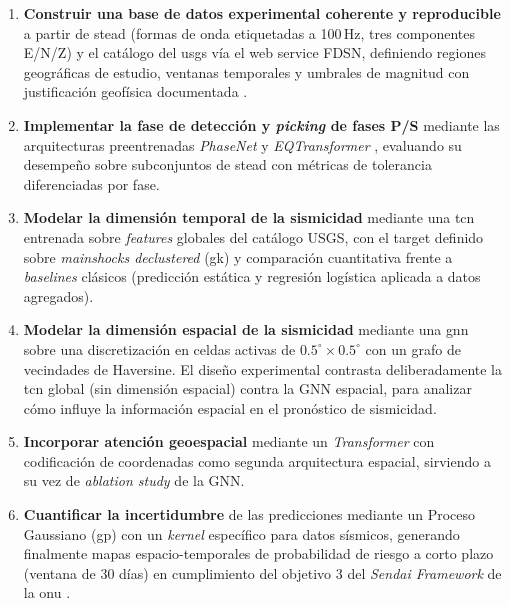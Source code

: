 \medskip
\begin{enumerate}[label=\destacado{\arabic*.}]
  \setlength\itemsep{1em}

  \item \textbf{Construir una base de datos experimental coherente y reproducible} a partir de \gls{stead} (formas de onda etiquetadas a 100\,Hz, tres componentes E/N/Z) y el catálogo del \gls{usgs} vía el web service FDSN, definiendo regiones geográficas de estudio, ventanas temporales y umbrales de magnitud con justificación geofísica documentada \citep{mousavi2019stead, wiemer2000mc, mignan2012mc}.

  \item \textbf{Implementar la fase de detección y \textit{picking} de fases P/S} mediante las arquitecturas preentrenadas \emph{PhaseNet} \citep{zhu2018phasenet} y \emph{EQTransformer} \citep{mousavi2020eqtransformer}, evaluando su desempeño sobre subconjuntos de \gls{stead} con métricas de tolerancia diferenciadas por fase.

  \item \textbf{Modelar la dimensión temporal de la sismicidad} mediante una \gls{tcn} \citep{bai2018tcn} entrenada sobre \textit{features} globales del catálogo USGS, con el target definido sobre \emph{mainshocks declustered} (\gls{gk}) y comparación cuantitativa frente a \textit{baselines} clásicos (predicción estática y regresión logística aplicada a datos agregados).

  \item \textbf{Modelar la dimensión espacial de la sismicidad} mediante una \gls{gnn} \citep{kipf2017gcn, scarselli2009gnn} sobre una discretización en celdas activas de $0.5^{\circ} \times 0.5^{\circ}$ con un grafo de vecindades de Haversine. El diseño experimental contrasta deliberadamente la \gls{tcn} global (sin dimensión espacial) contra la GNN espacial, para analizar cómo influye la información espacial en el pronóstico de sismicidad.

  \item \textbf{Incorporar atención geoespacial} mediante un \emph{Transformer} con codificación de coordenadas \citep{vaswani2017attention} como segunda arquitectura espacial, sirviendo a su vez de \emph{ablation study} de la GNN.

  \item \textbf{Cuantificar la incertidumbre} de las predicciones mediante un Proceso Gaussiano (\gls{gp}) \citep{rasmussen2006gp} con un \textit{kernel} específico para datos sísmicos, generando finalmente mapas espacio-temporales de probabilidad de riesgo a corto plazo (ventana de \(30\) días) en cumplimiento del objetivo 3 del \textit{Sendai Framework} de la \gls{onu} \citep{un2015sendai}.

\end{enumerate}

